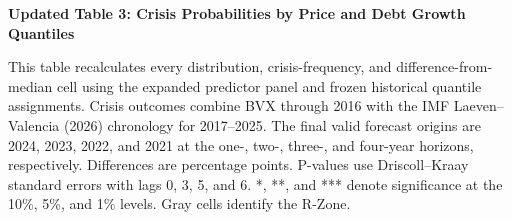 \documentclass[11pt]{article}
\begin{document}
\noindent\textbf{Updated Table 3: Crisis Probabilities by Price and Debt Growth Quantiles}

\smallskip
\noindent\footnotesize
This table recalculates every distribution, crisis-frequency, and
difference-from-median cell using the expanded predictor panel and frozen
historical quantile assignments. Crisis outcomes combine BVX through 2016 with
the IMF Laeven--Valencia (2026) chronology for 2017--2025. The final valid
forecast origins are 2024, 2023, 2022, and 2021 at the one-, two-, three-, and
four-year horizons, respectively. Differences are percentage points. P-values
use Driscoll--Kraay standard errors with lags 0, 3, 5, and 6. *, **, and ***
denote significance at the 10\%, 5\%, and 1\% levels. Gray cells identify the
R-Zone.

\normalsize
\medskip

\end{document}
